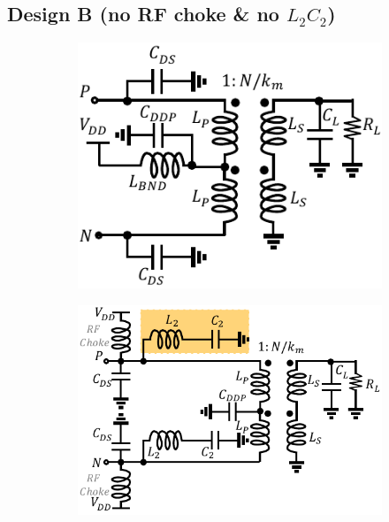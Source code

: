 \documentclass[conference]{IEEEtran}
\begin{document}
\subsection{Design B (no RF choke \& no $L_2C_2$)}

\begin{figure}[!t]
\captionsetup{font=footnotesize}
\centering
\begin{subfigure}{0.15\textwidth}
\centering
\includegraphics[width=1\textwidth]{Images/Design/Design_B_FC.pdf}
\caption{}
\label{fig:Design_B_FC}
\end{subfigure}
\begin{subfigure}{0.15\textwidth}
\centering
\includegraphics[width=1\textwidth]{Images/Design/Design_C_FC.pdf}

\end{subfigure}
\end{figure}
\end{document}
